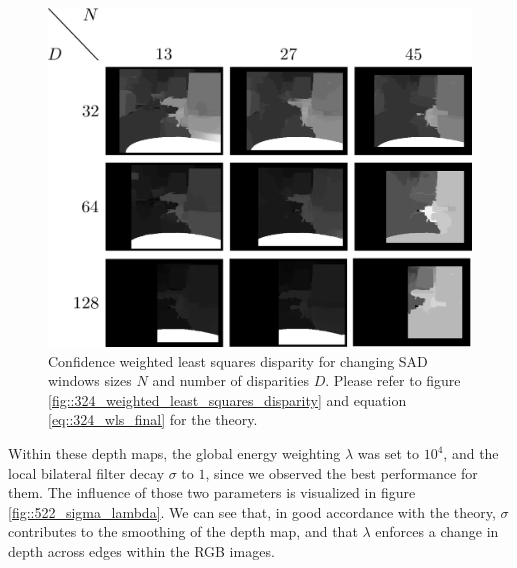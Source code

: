\begin{figure}[h]
	\centering
	\includegraphics[scale=.25]{chapters/05_experiments/02_autonomous_walking/02_depth_map_parameter_tuning/disp_sad_wls.png}
	\caption{Confidence weighted least squares disparity for changing SAD windows sizes $N$ and number of disparities $D$. Please refer to figure \ref{fig::324_weighted_least_squares_disparity} and equation \ref{eq::324_wls_final} for the theory.}
	\label{fig::522_disp_sad_wls}
\end{figure}
Within these depth maps, the global energy weighting $\lambda$ was set to $10^4$, and the local bilateral filter decay $\sigma$ to $1$, since we observed the best performance for them. The influence of those two parameters is visualized in figure \ref{fig::522_sigma_lambda}. We can see that, in good accordance with the theory, $\sigma$ contributes to the smoothing of the depth map, and that $\lambda$ enforces a change in depth across edges within the RGB images.
